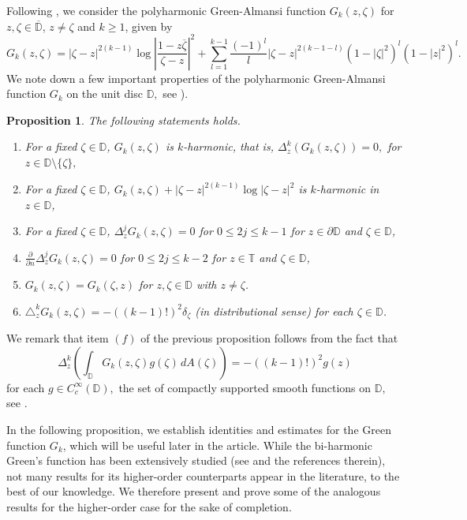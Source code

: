 \documentclass[10pt,oneside,reqno]{amsart}
\newtheorem{proposition}[theorem]{Proposition}
\theoremstyle{definition}
\theoremstyle{remark}
\newcommand{\abs}[1]{\left\lvert #1 \right\rvert}
\renewcommand{\le}{\leqslant}
\renewcommand{\ge}{\geqslant}
\newcommand{\D}{\mathbb D}
\newcommand{\T}{\mathbb T}
\numberwithin{equation}{section}
\begin{document}
Following \cite[Definition 1]{Begehr2002}, we consider the polyharmonic Green-Almansi function $G_k(z,\zeta)$ for $z, \zeta \in \overline{\mathbb{D}}$, $z \ne \zeta$ and $k \ge 1$, given by
\begin{equation*}
G_k(z, \zeta) = |\zeta - z|^{2(k-1)} \log \left| \frac{1 - z\overline{\zeta}}{\zeta - z} \right|^2 + \sum_{l=1}^{k-1} \frac{(-1)^{l}}{l} |\zeta - z|^{2(k-1-l)} (1 - |\zeta|^2)^{l} (1 - |z|^2)^{l}.
 \end{equation*}
We note down a few important properties of the polyharmonic Green-Almansi function $G_k$ on the unit disc $\mathbb D,$ see \cite[Page 86]{Begehr07}). 

\begin{proposition}\label{Basic properties of Green's function}
    The following statements holds.
\begin{enumerate}
    \item[(a)] For a fixed $\zeta \in \D$, $G_k (z, \zeta)$ is $k$-harmonic, that is, $\Delta_z^k(G_k(z,\zeta))=0,$ for $z \in \D \setminus \{ \zeta \},$
    \item[(b)] For a fixed  $\zeta \in \D$, $G_k (z, \zeta) + \abs{\zeta - z}^{2(k-1)} \log \abs{\zeta - z}^2$ is $k$-harmonic in $z \in \D$, 
    \item[(c)] For a fixed  $\zeta \in \D$, $\Delta_z ^j G_k (z, \zeta) = 0$ for $0 \le 2j \le k-1$ for $z \in \partial\D$ and $\zeta \in \D$,
    \item[(d)] $\frac{\partial}{\partial n} \Delta_z ^j G_k (z, \zeta) = 0$ for $0\le 2j \le k-2$ for $z\in \T$ and $\zeta \in \D$,
    \item[(e)] $G_k (z, \zeta) = G_k (\zeta , z)$ for $z, \zeta \in \D$ with $z\ne \zeta$.
    \item[(f)] $\triangle_z^k G_k(z,\zeta)= -((k-1)!)^2 \delta_{\zeta}$ (in distributional sense) for each $\zeta \in \mathbb D$.
\end{enumerate}
\end{proposition}

We remark that item $(f)$ of the previous proposition follows from the fact that 
\begin{equation*}
    \Delta_{z}^{k} \left( \int_{\D}  G_k (z, \zeta) g(\zeta) \, dA(\zeta) \right) = - ((k-1)!)^2g(z)
\end{equation*}
for each $g \in C_c^{\infty} (\D),$ the set of compactly supported smooth functions on $\D,$ see \cite[Page~95]{Begehr07}.

In the following proposition, we establish identities and estimates for the Green function $G_k$, which will be useful later in the article. While the bi-harmonic Green's function has been extensively studied (see \cite{Garbedian64, Begehr2002, DurenBergman, TheoryofBergmanJhu, AH2002} and the references therein), not many results for its higher-order counterparts appear in the literature, to the best of our knowledge. We therefore present and prove some of the analogous results for the higher-order case for the sake of completion. 
\end{document}
